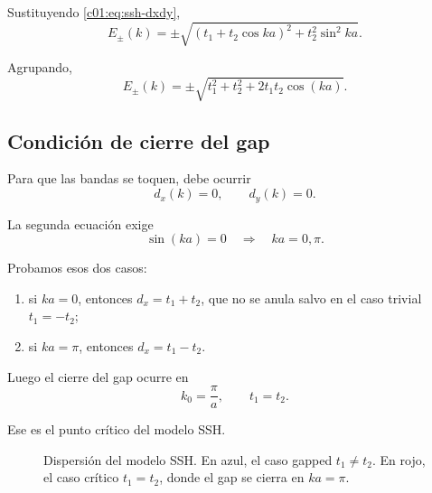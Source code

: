 Sustituyendo \eqref{c01:eq:ssh-dxdy},
\begin{equation}
E_\pm(k)=
\pm \sqrt{(t_1+t_2\cos ka)^2+t_2^2\sin^2 ka}.
\end{equation}

Agrupando,
\begin{equation}
E_\pm(k)=
\pm \sqrt{t_1^2+t_2^2+2t_1 t_2 \cos(ka)}.
\label{c01:eq:ssh-dispersion}
\end{equation}

\subsection{Condición de cierre del gap}

Para que las bandas se toquen, debe ocurrir
\begin{equation}
d_x(k)=0,
\qquad
d_y(k)=0.
\end{equation}

La segunda ecuación exige
\begin{equation}
\sin(ka)=0
\quad \Longrightarrow \quad
ka=0,\pi.
\end{equation}

Probamos esos dos casos:

\begin{enumerate}[leftmargin=*]
  \item si \(ka=0\), entonces \(d_x=t_1+t_2\), que no se anula salvo en el caso trivial \(t_1=-t_2\);
  \item si \(ka=\pi\), entonces \(d_x=t_1-t_2\).
\end{enumerate}

Luego el cierre del gap ocurre en
\begin{equation}
k_0=\frac{\pi}{a},
\qquad
t_1=t_2.
\label{c01:eq:ssh-critical}
\end{equation}

Ese es el punto crítico del modelo SSH.

\begin{figure}[ht]
\centering
{}
\caption{Dispersión del modelo SSH. En azul, el caso gapped \(t_1\neq t_2\). En rojo, el caso crítico \(t_1=t_2\), donde el gap se cierra en \(ka=\pi\).}
\label{c01:fig:ssh-disp}
\end{figure}

